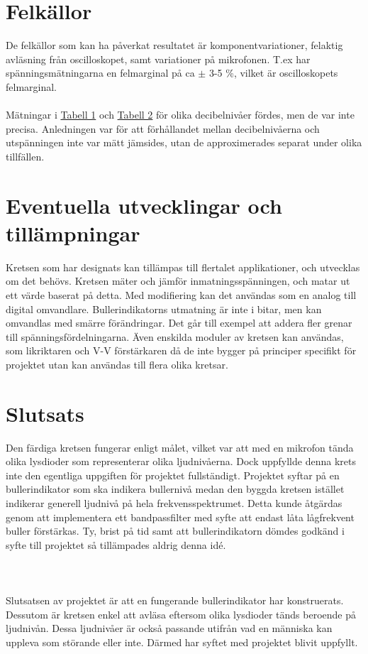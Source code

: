 \documentclass[12pt]{report}
\begin{document}
\section{Felkällor}
\label{sec:faulty}
De felkällor som kan ha påverkat resultatet är komponentvariationer, felaktig avläsning från oscilloskopet, samt variationer på mikrofonen. T.ex har spänningsmätningarna en felmarginal på ca $\pm$ 3-5 \%, vilket är  oscilloskopets felmarginal.
\\\\
Mätningar i \hyperref[tab:res1]{Tabell 1} och \hyperref[tab:res2]{Tabell 2} för olika decibelnivåer fördes, men de var inte precisa. Anledningen var för att förhållandet mellan decibelnivåerna och utspänningen inte var mätt jämsides, utan de approximerades separat under olika tillfällen.


\section{Eventuella utvecklingar och tillämpningar}
\label{sec:better}
Kretsen som har designats kan tillämpas till flertalet applikationer, och utvecklas om det behövs. Kretsen mäter och jämför inmatningsspänningen, och matar ut ett värde baserat på detta. Med modifiering kan det användas som en analog till digital omvandlare. Bullerindikatorns utmatning är inte i bitar, men kan omvandlas med smärre förändringar. Det går till exempel att addera fler grenar till spänningsfördelningarna. Även enskilda moduler av kretsen kan användas, som likriktaren och V-V förstärkaren då de inte bygger på principer specifikt för projektet utan kan användas till flera olika kretsar.

\section{Slutsats}
\label{sec:summary}
Den färdiga kretsen fungerar enligt målet, vilket var att med en mikrofon tända olika lysdioder som representerar olika ljudnivåerna. Dock uppfyllde denna krets inte den egentliga uppgiften för projektet fullständigt. Projektet syftar på en bullerindikator som ska indikera bullernivå medan den byggda kretsen istället indikerar generell ljudnivå på hela frekvensspektrumet. Detta kunde åtgärdas genom att implementera ett bandpassfilter med syfte att endast låta lågfrekvent buller förstärkas. Ty, brist på tid samt att bullerindikatorn dömdes godkänd i syfte till projektet så tillämpades aldrig denna idé. 
\\\\\\\\
Slutsatsen av projektet är att en fungerande bullerindikator har konstruerats. Dessutom är kretsen enkel att avläsa eftersom olika lysdioder tänds beroende på ljudnivån. Dessa ljudnivåer är också passande utifrån vad en människa kan uppleva som störande eller inte. Därmed har syftet med projektet blivit uppfyllt. 
\end{document}

